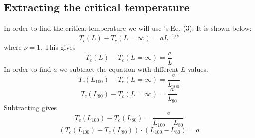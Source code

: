\documentclass{article}
\begin{document}
\subsection{Extracting the critical temperature}

In order to find the critical temperature we will use \cite{task}'s Eq. (3). It is shown below:
$$T_c(L)-T_c(L=\infty)=aL^{-1/\nu}$$
where $\nu=1$. This gives
$$T_c(L)-T_c(L=\infty)=\frac{a}{L}$$
In order to find $a$ we subtract the equation with different $L$-values.
$$T_c(L_{100})-T_c(L=\infty)=\frac{a}{L_{100}}$$
$$T_c(L_{80})-T_c(L=\infty)=\frac{a}{L_{80}}$$
Subtracting gives
$$T_c(L_{100})-T_c(L_{80})=\frac{a}{L_{100}-L_{80}}$$
$$(T_c(L_{100})-T_c(L_{80}))\cdot(L_{100}-L_{80})=a$$ \label{eq:finding-a}






\end{document}
